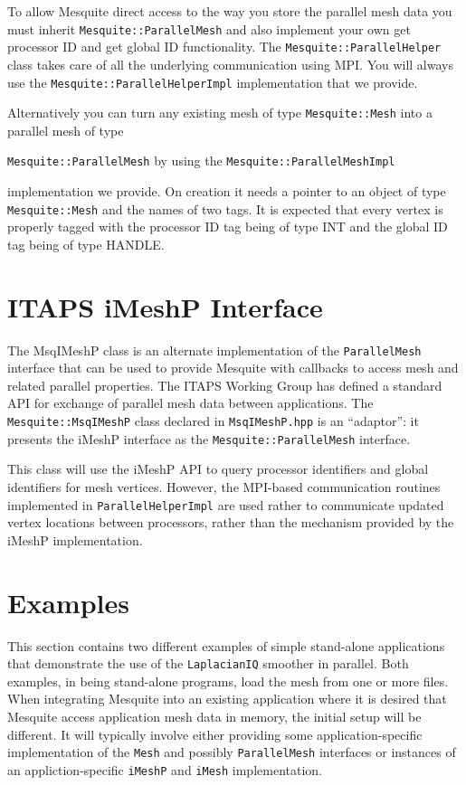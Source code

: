 To allow Mesquite direct access to the way you store the parallel mesh data you must inherit \texttt{Mesquite::ParallelMesh} and also implement your own get processor ID and get global ID functionality. The \texttt{Mesquite::ParallelHelper} class takes care of all the underlying communication using MPI. You will always use the \texttt{Mesquite::ParallelHelperImpl} implementation that we provide.

Alternatively you can turn any existing mesh of type \texttt{Mesquite::Mesh} into a parallel mesh of type\vspace{-5pt} \begin{center}
\texttt{Mesquite::ParallelMesh} by using the \texttt{Mesquite::ParallelMeshImpl} 
\end{center} \vspace{-5 pt}implementation we provide. On creation it needs a pointer to an object of type \texttt{Mesquite::Mesh} and the names of two tags. It is expected that every vertex is properly tagged with the processor ID tag being of type INT and the global ID tag being of type HANDLE.

\section{ITAPS iMeshP Interface}

The MsqIMeshP class is an alternate implementation of the \texttt{ParallelMesh} interface that can be used to provide Mesquite with callbacks to access mesh and related parallel properties.  The ITAPS Working Group has defined a standard API for exchange of parallel mesh data between applications. The \texttt{Mesquite::MsqIMeshP} class declared in \texttt{MsqIMeshP.hpp} is an ``adaptor'':  it presents the iMeshP interface as the \texttt{Mesquite::ParallelMesh} interface.  

This class will use the iMeshP API to query processor identifiers and global identifiers for mesh vertices.  However, the MPI-based communication routines implemented in \texttt{ParallelHelperImpl} are used rather to communicate updated vertex locations between processors, rather than the mechanism provided by the iMeshP implementation.

\section{Examples}

This section contains two different examples of simple stand-alone applications that demonstrate the use of the \texttt{LaplacianIQ} smoother in parallel.  Both examples, in being stand-alone programs, load the mesh from one or more files.  When integrating Mesquite into an existing application where it is desired that Mesquite access application mesh data in memory, the initial setup will be different.  It will typically involve either providing some application-specific implementation of the \texttt{Mesh} and possibly \texttt{ParallelMesh} interfaces or instances of an appliction-specific \texttt{iMeshP} and \texttt{iMesh} implementation.

